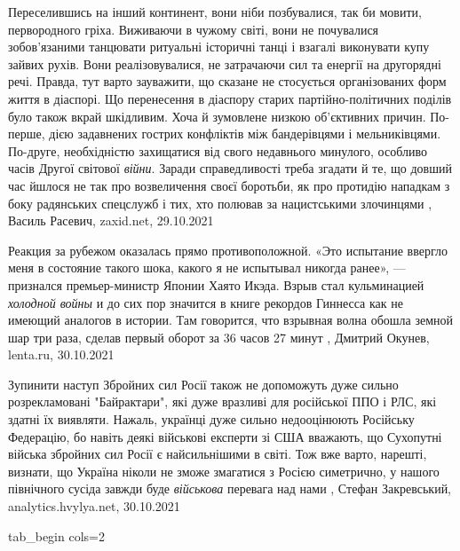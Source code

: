 Переселившись на інший континент, вони ніби позбувалися, так би мовити,
первородного гріха. Виживаючи в чужому світі, вони не почувалися зобов’язаними
танцювати ритуальні історичні танці і взагалі виконувати купу зайвих рухів.
Вони реалізовувалися, не затрачаючи сил та енергії на другорядні речі. Правда,
тут варто зауважити, що сказане не стосується організованих форм життя в
діаспорі. Що перенесення в діаспору старих партійно-політичних поділів було
також вкрай шкідливим. Хоча й зумовлене низкою об’єктивних причин. По-перше,
дією задавнених гострих конфліктів між бандерівцями і мельниківцями. По-друге,
необхідністю захищатися від свого недавнього минулого, особливо часів Другої
світової \emph{війни}. Заради справедливості треба згадати й те, що довший час йшлося
не так про возвеличення своєї боротьби, як про протидію нападкам з боку
радянських спецслужб і тих, хто полював за нацистськими злочинцями
, 
Василь Расевич, zaxid.net, 29.10.2021

Реакция за рубежом оказалась прямо противоположной. «Это испытание ввергло меня
в состояние такого шока, какого я не испытывал никогда ранее», — признался
премьер-министр Японии Хаято Икэда.  Взрыв стал кульминацией \emph{холодной
войны} и до сих пор значится в книге рекордов Гиннесса как не имеющий аналогов
в истории. Там говорится, что взрывная волна обошла земной шар три раза, сделав
первый оборот за 36 часов 27 минут
, Дмитрий Окунев, lenta.ru, 30.10.2021

Зупинити наступ Збройних сил Росії також не допоможуть дуже сильно
розрекламовані "Байрактари", які дуже вразливі для російської ППО і РЛС, які
здатні їх виявляти. Нажаль, українці дуже сильно недооцінюють Російську
Федерацію, бо навіть деякі військові експерти зі США вважають, що Сухопутні
війська збройних сил Росії є найсильнішими в світі. Тож вже варто, нарешті,
визнати, що Україна ніколи не зможе змагатися з Росією симетрично, у нашого
північного сусіда завжди буде \emph{військова} перевага над нами
, 
Стефан Закревський, analytics.hvylya.net, 30.10.2021

\ifcmt
  tab_begin cols=2

